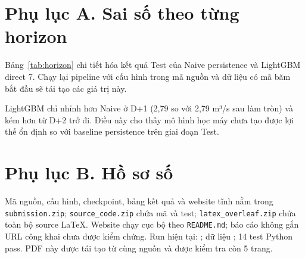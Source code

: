 \section*{Phụ lục A. Sai số theo từng horizon}

Bảng~\ref{tab:horizon} chi tiết hóa kết quả Test của Naive persistence và LightGBM
direct 7. Chạy lại pipeline với cấu hình trong mã nguồn và dữ liệu có mã băm bắt đầu
\texttt{\DatasetHashShort} sẽ tái tạo các giá trị này.

\begin{table}[H]
\centering
\caption{Sai số Test theo horizon (724 ngày gốc mỗi horizon)}
\label{tab:horizon}
\small

\end{table}

LightGBM chỉ nhỉnh hơn Naive ở D+1 (2,79 so với 2,79 m³/s sau làm tròn) và kém hơn
từ D+2 trở đi. Điều này cho thấy mô hình học máy chưa tạo được lợi thế ổn định so với
baseline persistence trên giai đoạn Test.

\section*{Phụ lục B. Hồ sơ số}

Mã nguồn, cấu hình, checkpoint, bảng kết quả và website tĩnh nằm trong
\texttt{submission.zip}; \texttt{source\_code.zip} chứa mã và test;
\texttt{latex\_overleaf.zip} chứa toàn bộ source LaTeX. Website chạy cục bộ theo
\texttt{README.md}; báo cáo không gắn URL công khai chưa được kiểm chứng. Run hiện tại:
\texttt{\RunId}; dữ liệu \texttt{\DatasetHashShort}; 14 test Python pass. PDF này được
tái tạo từ cùng nguồn và được kiểm tra còn 5 trang.

